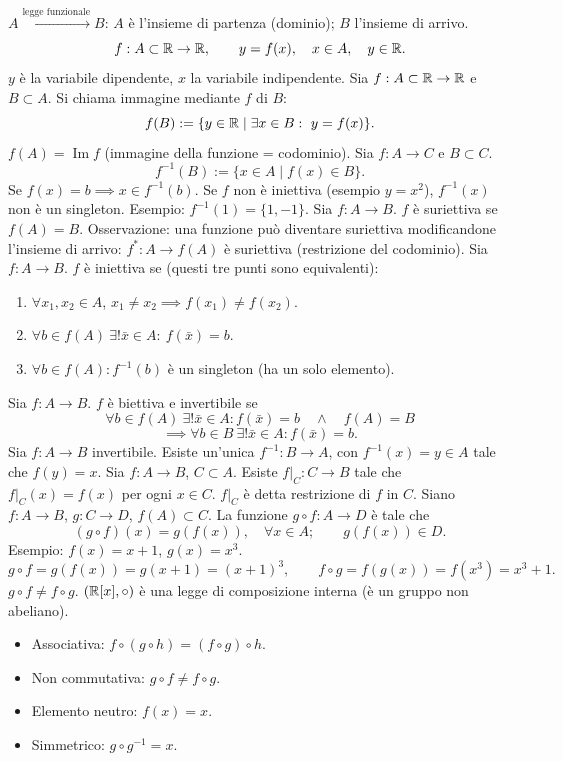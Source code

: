 $A\xrightarrow{\text{legge funzionale}}B$: $A$ è l'insieme di partenza (dominio); $B$ l'insieme di arrivo.
\[f:A\subset\mathbb R\to\mathbb R,\qquad y=f(x),\quad x\in A,\quad y\in\mathbb R.\]
$y$ è la variabile dipendente, $x$ la variabile indipendente.
Sia $f:A\subset\mathbb R\to\mathbb R$ e $B\subset A$. Si chiama immagine mediante $f$ di $B$:
\[f(B):=\{y\in\R\mid\exists x\in B:\ y=f(x)\}.\]
$f(A)=\operatorname{Im}f$ (immagine della funzione = codominio).
Sia $f:A\to C$ e $B\subset C$.
\[f^{-1}(B):=\{x\in A\mid f(x)\in B\}.\]
Se $f(x)=b\implies x\in f^{-1}(b)$.
Se $f$ non è iniettiva (esempio $y=x^2$), $f^{-1}(x)$ non è un singleton.
Esempio: $f^{-1}(1)=\{1,-1\}$.
Sia $f:A\to B$. $f$ è suriettiva se $f(A)=B$.
Osservazione: una funzione può diventare suriettiva modificandone l'insieme di arrivo:
$f^*:A\to f(A)$ è suriettiva (restrizione del codominio).
Sia $f:A\to B$. $f$ è iniettiva se (questi tre punti sono equivalenti):
\begin{enumerate}\item $\forall x_1,x_2\in A$, $x_1\ne x_2\implies f(x_1)\ne f(x_2)$.
\item $\forall b\in f(A)\ \exists!\bar x\in A:\ f(\bar x)=b$.
\item $\forall b\in f(A):f^{-1}(b)$ è un singleton (ha un solo elemento).
\end{enumerate}
Sia $f:A\to B$. $f$ è biettiva e invertibile se
\[\forall b\in f(A)\ \exists!\bar x\in A:f(\bar x)=b\quad\land\quad f(A)=B\]
\[\implies\forall b\in B\ \exists!\bar x\in A:f(\bar x)=b.\]
Sia $f:A\to B$ invertibile. Esiste un'unica $f^{-1}:B\to A$, con
$f^{-1}(x)=y\in A$ tale che $f(y)=x$.
Sia $f:A\to B$, $C\subset A$. Esiste $f|_C:C\to B$ tale che
$f|_C(x)=f(x)$ per ogni $x\in C$. $f|_C$ è detta restrizione di $f$ in $C$.
Siano $f:A\to B$, $g:C\to D$, $f(A)\subset C$. La funzione $g\circ f:A\to D$ è tale che
\[(g\circ f)(x)=g(f(x)),\quad\forall x\in A;\qquad g(f(x))\in D.\]
Esempio: $f(x)=x+1$, $g(x)=x^3$.
\[g\circ f=g(f(x))=g(x+1)=(x+1)^3,\qquad f\circ g=f(g(x))=f(x^3)=x^3+1.\]
$g\circ f\ne f\circ g$.
$(\mathbb R[x],\circ)$ è una legge di composizione interna (è un gruppo non abeliano).
\begin{itemize}\item Associativa: $f\circ(g\circ h)=(f\circ g)\circ h$.
\item Non commutativa: $g\circ f\ne f\circ g$.
\item Elemento neutro: $f(x)=x$.
\item Simmetrico: $g\circ g^{-1}=x$.
\end{itemize}
